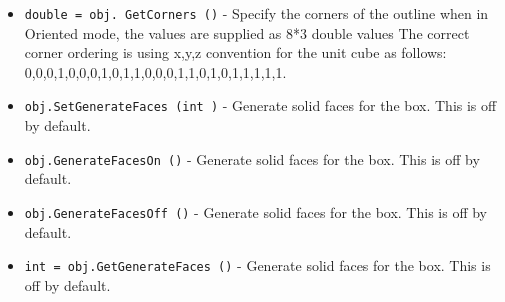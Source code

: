 \begin{itemize}
\item  \verb|double = obj. GetCorners ()| -  Specify the corners of the outline when in Oriented mode, the
 values are supplied as 8*3 double values The correct corner
 ordering is using {x,y,z} convention for the unit cube as follows:
 {0,0,0},{1,0,0},{0,1,0},{1,1,0},{0,0,1},{1,0,1},{0,1,1},{1,1,1}.

\item  \verb|obj.SetGenerateFaces (int )| -  Generate solid faces for the box. This is off by default.

\item  \verb|obj.GenerateFacesOn ()| -  Generate solid faces for the box. This is off by default.

\item  \verb|obj.GenerateFacesOff ()| -  Generate solid faces for the box. This is off by default.

\item  \verb|int = obj.GetGenerateFaces ()| -  Generate solid faces for the box. This is off by default.

\end{itemize}
